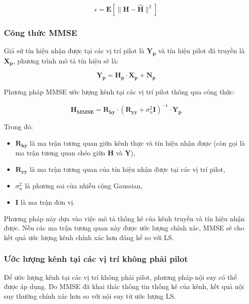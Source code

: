 \begin{equation}
    \epsilon = \bm{E} \left[ \| \bm{H} - \bm{\hat{H}} \|^2 \right]
\end{equation}

\subsubsection{Công thức MMSE}

Giả sử tín hiệu nhận được tại các vị trí pilot là \( \bm{Y_p} \) và tín hiệu pilot đã truyền là \( \bm{X_p} \), phương trình mô tả tín hiệu sẽ là:

\begin{equation}
    \bm{Y_p} = \bm{H_p} \cdot \bm{X_p} + \bm{N_p}
\end{equation}

Phương pháp MMSE ước lượng kênh tại các vị trí pilot thông qua công thức:

\begin{equation}
    \bm{H_{MMSE}} = \bm{R_{hy}} \cdot (\bm{R_{yy}} + \sigma_n^2 \bm{I})^{-1} \cdot \bm{Y_p}
\end{equation}

Trong đó:
\begin{itemize}
    \item $\bm{R_{hy}}$ là ma trận tương quan giữa kênh thực và tín hiệu nhận được (còn gọi là ma trận tương quan chéo giữa $\bm{H}$ và $\bm{Y}$),
    \item $\bm{R_{yy}}$ là ma trận tương quan của tín hiệu nhận được tại các vị trí pilot,
    \item $\sigma_n^2$ là phương sai của nhiễu cộng Gaussian,
    \item $\bm{I}$ là ma trận đơn vị.
\end{itemize}

Phương pháp này dựa vào việc mô tả thống kê của kênh truyền và tín hiệu nhận được. 
Nếu các ma trận tương quan này được ước lượng chính xác, MMSE sẽ cho kết quả ước lượng kênh chính xác hơn đáng kể so với LS.

\subsubsection{Ước lượng kênh tại các vị trí không phải pilot}

Để ước lượng kênh tại các vị trí không phải pilot, phương pháp nội suy có thể được áp dụng. 
Do MMSE đã khai thác thông tin thống kê của kênh, kết quả nội suy thường chính xác hơn so với nội suy từ ước lượng LS.

